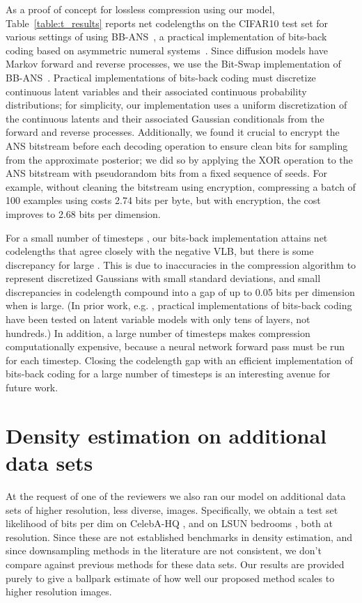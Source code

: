 \documentclass{article}
\begin{document}
As a proof of concept for lossless compression using our model, Table~\ref{table:t_results} reports net codelengths on the CIFAR10 test set for various settings of  using BB-ANS~\citep{townsend2018practical}, a practical implementation of bits-back coding based on asymmetric numeral systems~\citep{duda2009asymmetric}. Since diffusion models have Markov forward and reverse processes, we use the Bit-Swap implementation of BB-ANS~\citep{kingma2019bit}. Practical implementations of bits-back coding must discretize continuous latent variables and their associated continuous probability distributions; for simplicity, our implementation uses a uniform discretization of the continuous latents and their associated Gaussian conditionals from the forward and reverse processes. Additionally, we found it crucial to encrypt the ANS bitstream before each decoding operation to ensure clean bits for sampling from the approximate posterior; we did so by applying the XOR operation to the ANS bitstream with pseudorandom bits from a fixed sequence of seeds. For example, without cleaning the bitstream using encryption, compressing a batch of 100 examples using  costs 2.74 bits per byte, but with encryption, the cost improves to 2.68 bits per dimension.

For a small number of timesteps , our bits-back implementation attains net codelengths that agree closely with the negative VLB, but there is some discrepancy for large . This is due to inaccuracies in the compression algorithm to represent discretized Gaussians with small standard deviations, and small discrepancies in codelength  compound into a gap of up to 0.05 bits per dimension when  is large. (In prior work, e.g. \citep{kingma2019bit,ho2019compression,townsend2020hilloc}, practical implementations of bits-back coding have been tested on latent variable models with only tens of layers, not hundreds.) In addition, a large number of timesteps makes compression computationally expensive, because a neural network forward pass must be run for each timestep. Closing the codelength gap with an efficient implementation of bits-back coding for a large number of timesteps is an interesting avenue for future work.

\section{Density estimation on additional data sets}
At the request of one of the reviewers we also ran our model on additional data sets of higher resolution, less diverse, images. Specifically, we obtain a test set likelihood of  bits per dim on CelebA-HQ \citep{karras2017progressive}, and  on LSUN bedrooms \citep{yu2015lsun}, both at  resolution. Since these are not established benchmarks in density estimation, and since downsampling methods in the literature are not consistent, we don't compare against previous methods for these data sets. Our results are provided purely to give a ballpark estimate of how well our proposed method scales to higher resolution images.
\end{document}
